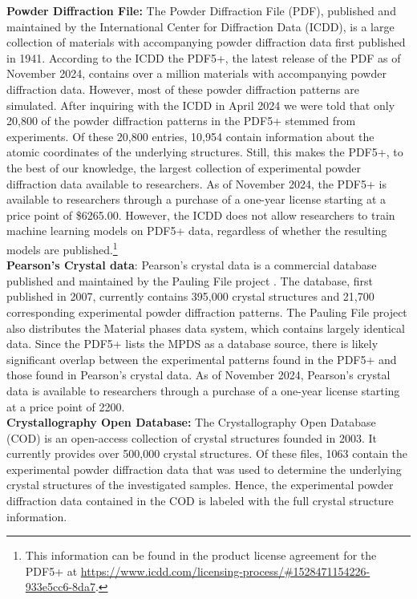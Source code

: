 \textbf{Powder Diffraction File:} \cite{PDFWeb} The Powder Diffraction File (PDF), published and maintained by the International Center for Diffraction Data (ICDD), is a large collection of materials with accompanying powder diffraction data first published in 1941\cite{GatesRector2019}. According to the ICDD the PDF5+, the latest release of the PDF as of November 2024, contains over a million materials with accompanying powder diffraction data. However, most of these powder diffraction patterns are simulated. After inquiring with the ICDD in April 2024 we were told that only 20,800 of the powder diffraction patterns in the PDF5+ stemmed from experiments. Of these 20,800 entries, 10,954 contain information about the atomic coordinates of the underlying structures.%
Still, this makes the PDF5+, to the best of our knowledge, the largest collection of experimental powder diffraction data available to researchers. As of November 2024, the PDF5+ is available to researchers through a purchase of a one-year license starting at a price point of \$6265.00. However, the ICDD does not allow researchers to train machine learning models on PDF5+ data, regardless of whether the resulting models are published.\footnote{This information can be found in the product license agreement for the PDF5+ at \url{https://www.icdd.com/licensing-process/\#1528471154226-933e5cc6-8da7}.} \\

\textbf{Pearson's Crystal data}:\cite{PearsonWeb} Pearson's crystal data is a commercial database published and maintained by the Pauling File project \cite{kaduk2007}. The database, first published in 2007, currently contains 395,000 crystal structures and 21,700 corresponding experimental powder diffraction patterns. The Pauling File project also distributes the Material phases data system, which contains largely identical data. Since the PDF5+ lists the MPDS as a database source, there is likely significant overlap between the experimental patterns found in the PDF5+ and those found in Pearson's crystal data. As of November 2024, Pearson's crystal data is available to researchers through a purchase of a one-year license starting at a price point of \qty{2200}{\myeuro}.\\ 

\textbf{Crystallography Open Database:} \cite{CODWeb} The Crystallography Open Database (COD) is an open-access collection of crystal structures founded in 2003\cite{Graulis2009cod}. It currently provides over 500,000 crystal structures. Of these files, 1063 contain the experimental powder diffraction data that was used to determine the underlying crystal structures of the investigated samples. Hence, the experimental powder diffraction data contained in the COD is labeled with the full crystal structure information. \\


